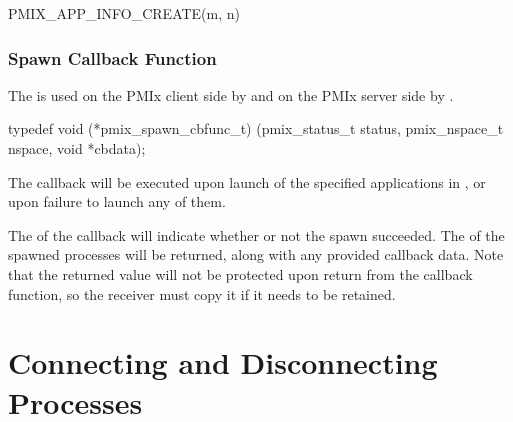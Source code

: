 \cspecificstart
\begin{codepar}
PMIX_APP_INFO_CREATE(m, n)
\end{codepar}
\cspecificend

\begin{arglist}
\end{arglist}


\subsubsection{Spawn Callback Function}

\summary

The  is used on the PMIx client side by  and on the PMIx server side by .

\cspecificstart
\begin{codepar}
typedef void (*pmix_spawn_cbfunc_t)
    (pmix_status_t status,
     pmix_nspace_t nspace, void *cbdata);
\end{codepar}
\cspecificend

\begin{arglist}
\end{arglist}


\descr

The callback will be executed upon launch of the specified applications in , or upon failure to launch any of them.

The  of the callback will indicate whether or not the spawn succeeded.
The  of the spawned processes will be returned, along with any provided callback data.
Note that the returned  value will not be protected upon return from the callback function, so the receiver must copy it if it needs to be retained.


\section{Connecting and Disconnecting Processes}
\label{chap:api_proc_mgmt:connect}

